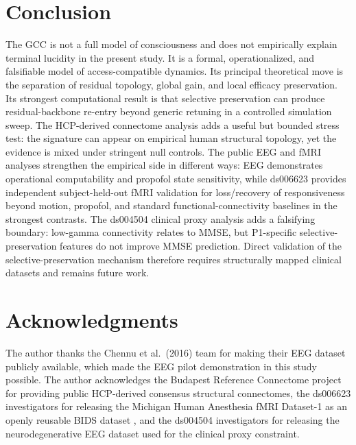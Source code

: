 \documentclass[11pt,a4paper]{article}
\theoremstyle{plain}
\theoremstyle{definition}
\theoremstyle{remark}
\begin{document}
\section{Conclusion}
\label{sec:schluss}

The GCC is not a full model of consciousness and does not empirically explain terminal lucidity in the present study. It is a formal, operationalized, and falsifiable model of access-compatible dynamics. Its principal theoretical move is the separation of residual topology, global gain, and local efficacy preservation. Its strongest computational result is that selective preservation can produce residual-backbone re-entry beyond generic retuning in a controlled simulation sweep. The HCP-derived connectome analysis adds a useful but bounded stress test: the signature can appear on empirical human structural topology, yet the evidence is mixed under stringent null controls. The public EEG and fMRI analyses strengthen the empirical side in different ways: EEG demonstrates operational computability and propofol state sensitivity, while ds006623 provides independent subject-held-out fMRI validation for loss/recovery of responsiveness beyond motion, propofol, and standard functional-connectivity baselines in the strongest contrasts. The ds004504 clinical proxy analysis adds a falsifying boundary: low-gamma connectivity relates to MMSE, but P1-specific selective-preservation features do not improve MMSE prediction. Direct validation of the selective-preservation mechanism therefore requires structurally mapped clinical datasets and remains future work.


\newpage
\section*{Acknowledgments}

The author thanks the Chennu et al.\ (2016) team for making their EEG dataset publicly available, which made the EEG pilot demonstration in this study possible. The author acknowledges the Budapest Reference Connectome project for providing public HCP-derived consensus structural connectomes, the ds006623 investigators for releasing the Michigan Human Anesthesia fMRI Dataset-1 as an openly reusable BIDS dataset \citep{huang2026,huangopenneuro2025}, and the ds004504 investigators for releasing the neurodegenerative EEG dataset used for the clinical proxy constraint.
\end{document}
